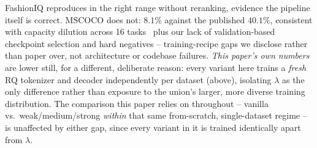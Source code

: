 FashionIQ reproduces in the right range without reranking, evidence the pipeline itself is correct. MSCOCO does not: $8.1\%$ against the published $40.1\%$, consistent with capacity dilution across 16 tasks~\cite{pradeep2023scale} plus our lack of validation-based checkpoint selection and hard negatives -- training-recipe gaps we disclose rather than paper over, not architecture or codebase failures. \emph{This paper's own numbers} are lower still, for a different, deliberate reason: every variant here trains a \emph{fresh} RQ tokenizer and decoder independently per dataset (above), isolating $\lambda$ as the only difference rather than exposure to the union's larger, more diverse training distribution. The comparison this paper relies on throughout -- vanilla vs.\ weak/medium/strong \emph{within} that same from-scratch, single-dataset regime -- is unaffected by either gap, since every variant in it is trained identically apart from $\lambda$.

